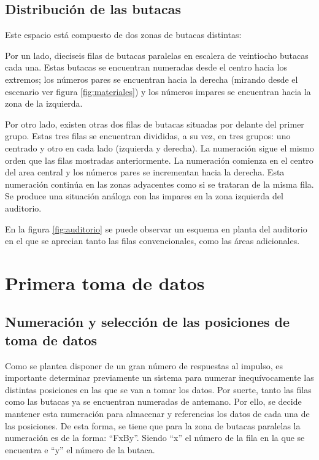 \documentclass[11pt,a4paper,twoside]{book}
\begin{document}
		\subsection{Distribución de las butacas}
			Este espacio está compuesto de dos zonas de butacas distintas:

 			Por un lado, dieciseis filas de butacas paralelas en escalera de veintiocho butacas cada una. Estas butacas se encuentran numeradas desde el centro hacia los extremos; los números pares se encuentran hacia la derecha (mirando desde el escenario ver figura \ref{fig:materiales}) y los números impares se encuentran hacia la zona de la izquierda.
 
 			Por otro lado, existen otras dos filas de butacas situadas por delante del primer grupo. Estas tres filas se encuentran divididas, a su vez, en tres grupos: uno centrado y otro en cada lado (izquierda y derecha). La numeración sigue el mismo orden que las filas mostradas anteriormente. La numeración comienza en el centro del area central y los números pares se incrementan hacia la derecha. Esta numeración continúa en las zonas adyacentes como si se trataran de la misma fila. Se produce una situación análoga con las impares en la zona izquierda del auditorio.
 
 			En la figura \ref{fig:auditorio} se puede observar un esquema en planta del auditorio en el que se aprecian tanto las filas convencionales, como las áreas adicionales.
			
			
    \section{Primera toma de datos}
	    \subsection{Numeración y selección de las posiciones de toma de datos}
		    Como se plantea disponer de un gran número de respuestas al impulso, es importante determinar previamente un sistema para numerar inequívocamente las distintas posiciones en las que se van a tomar los datos. Por suerte, tanto las filas como las butacas ya se encuentran numeradas de antemano. Por ello, se decide mantener esta numeración para almacenar y referencias los datos de cada una de las posiciones. De esta forma, se tiene que para la zona de butacas paralelas la numeración es de la forma: ``FxBy''. Siendo ``x'' el número de la fila en la que se encuentra e ``y'' el número de la butaca.
\end{document}
